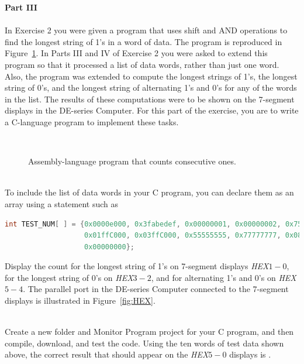 \documentclass[epsfig,10pt,fullpage]{article}
\begin{document}
\noindent
{\bf Part III}
~\\
~\\
\noindent
In Exercise 2 you were given a program that uses shift and AND operations to find the
longest string of 1's in a word of data. The program is reproduced in
Figure~\ref{fig:shiftAND}.  In Parts III and IV of Exercise 2 you were asked to extend
this program so that it processed a list of data words, rather than just one word. Also,
the program was extended to compute the longest
strings of 1's, the longest string of 0's, and the longest string of alternating 1's and 0's
for any of the words in the list. The results of these computations were to be shown 
on the 7-segment displays in the DE-series Computer. For this part of the exercise, you are 
to write a C-language program to implement these tasks.

~\\
\begin{figure}[H]
\begin{center}

\end{center}
\caption{Assembly-language program that counts consecutive ones.}
\label{fig:shiftAND}
\end{figure}

~\\
\noindent
To include the list of data words in your C program, you can declare them as an array using
a statement such as

\noindent
\begin{lstlisting}[language=C]
int TEST_NUM[ ] = {0x0000e000, 0x3fabedef, 0x00000001, 0x00000002, 0x75a5a5a5,
                   0x01ffC000, 0x03ffC000, 0x55555555, 0x77777777, 0x08888888,
                   0x00000000};
\end{lstlisting}

\noindent
Display the count for the longest string of 1's on 7-segment displays {\it HEX}$1-0$, 
for the longest string of 0's on {\it HEX}$3-2$, and for 
alternating 1's and 0's on {\it HEX}$5-4$. 
The parallel port in the DE-series Computer connected to the 7-segment displays 
is illustrated in Figure~\ref{fig:HEX}.

~\\
\noindent
Create a new folder and Monitor Program project for your C program, and then compile,
download, and test the code. Using the ten words of test data shown above, the correct
result that should appear on the {\it HEX}$5-0$ displays is .
\end{document}
